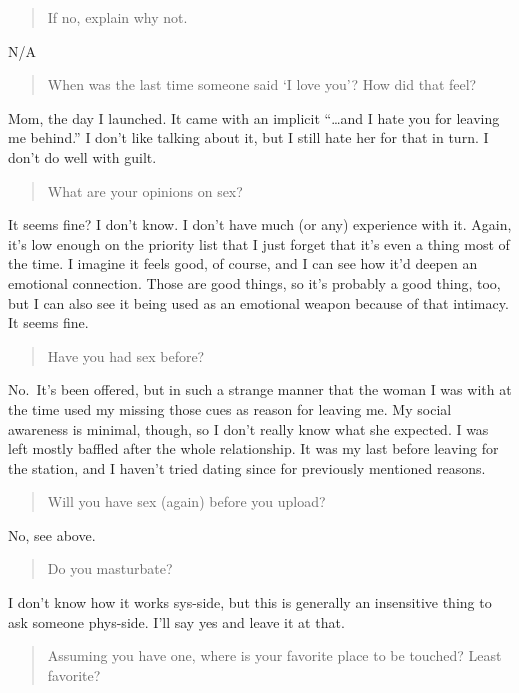 \begin{quote}
If no, explain why not.
\end{quote}

\noindent N/A

\begin{quote}
When was the last time someone said `I love you'? How did that feel?
\end{quote}

\noindent Mom, the day I launched. It came with an implicit ``\ldots and I hate you for leaving me behind.'' I don't like talking about it, but I still hate her for that in turn. I don't do well with guilt.

\begin{quote}
What are your opinions on sex?
\end{quote}

\noindent It seems fine? I don't know. I don't have much (or any) experience with it. Again, it's low enough on the priority list that I just forget that it's even a thing most of the time. I imagine it feels good, of course, and I can see how it'd deepen an emotional connection. Those are good things, so it's probably a good thing, too, but I can also see it being used as an emotional weapon because of that intimacy. It seems fine.

\begin{quote}
Have you had sex before?
\end{quote}

\noindent No.~It's been offered, but in such a strange manner that the woman I was with at the time used my missing those cues as reason for leaving me. My social awareness is minimal, though, so I don't really know what she expected. I was left mostly baffled after the whole relationship. It was my last before leaving for the station, and I haven't tried dating since for previously mentioned reasons.

\begin{quote}
Will you have sex (again) before you upload?
\end{quote}

\noindent No, see above.

\begin{quote}
Do you masturbate?
\end{quote}

\noindent I don't know how it works sys-side, but this is generally an insensitive thing to ask someone phys-side. I'll say yes and leave it at that.

\begin{quote}
Assuming you have one, where is your favorite place to be touched? Least favorite?
\end{quote}

